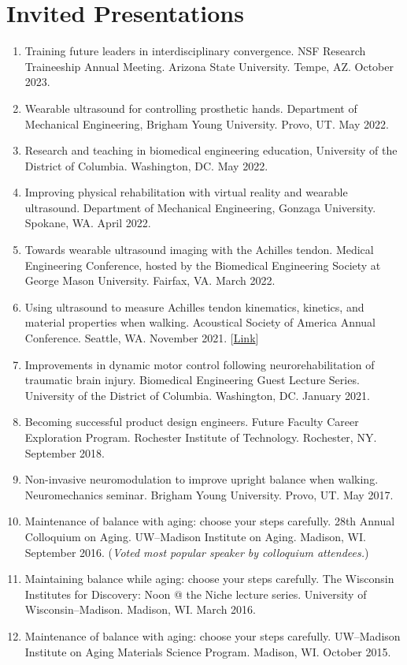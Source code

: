 \documentclass[letterpaper, 10pt]{article}
\begin{document}
\section{Invited Presentations}
\begin{enumerate}
    \item  Training future leaders in interdisciplinary convergence. NSF Research Traineeship Annual Meeting. Arizona State University. Tempe, AZ. October 2023. 
    \item  Wearable ultrasound for controlling prosthetic hands. Department of Mechanical Engineering, Brigham Young University. Provo, UT. May 2022.
    \item  Research and teaching in biomedical engineering education, University of the District of Columbia. Washington, DC. May 2022.
    \item  Improving physical rehabilitation with virtual reality and wearable ultrasound. Department of Mechanical Engineering, Gonzaga University. Spokane, WA. April 2022.
    \item  Towards wearable ultrasound imaging with the Achilles tendon. Medical Engineering Conference, hosted by the Biomedical Engineering Society at George Mason University. Fairfax, VA. March 2022.
    \item  Using ultrasound to measure Achilles tendon kinematics, kinetics, and material properties when walking. Acoustical Society of America Annual Conference. Seattle, WA. November 2021. [\href{https://asa.scitation.org/doi/10.1121/10.0008319}{Link}]
    \item  Improvements in dynamic motor control following neurorehabilitation of traumatic brain injury. Biomedical Engineering Guest Lecture Series. University of the District of Columbia. Washington, DC. January 2021.
    \item  Becoming successful product design engineers. Future Faculty Career Exploration Program. Rochester Institute of Technology. Rochester, NY. September 2018.
    \item  Non-invasive neuromodulation to improve upright balance when walking. Neuromechanics seminar. Brigham Young University. Provo, UT. May 2017.
    \item  Maintenance of balance with aging: choose your steps carefully. 28th Annual Colloquium on Aging. UW--Madison Institute on Aging. Madison, WI. September 2016. (\textit{Voted most popular speaker by colloquium attendees.})
    \item  Maintaining balance while aging: choose your steps carefully. The Wisconsin Institutes for Discovery: Noon @ the Niche lecture series. University of Wisconsin--Madison. Madison, WI. March 2016.
    \item Maintenance of balance with aging: choose your steps carefully. UW--Madison Institute on Aging Materials Science Program. Madison, WI. October 2015.
\end{enumerate}
\end{document}
